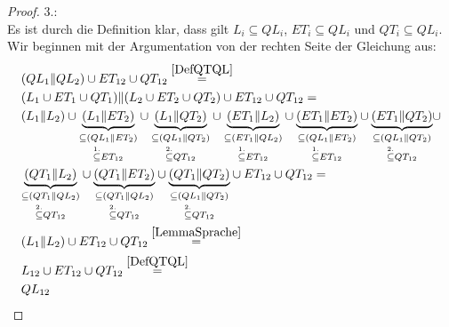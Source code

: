 \begin{proof}
  3.:\\
  Es ist durch die Definition klar, dass gilt $L_i\subseteq QL_i$,
  $ET_i\subseteq QL_i$ und $QT_i\subseteq QL_i$. Wir beginnen mit der
  Argumentation von der rechten Seite der Gleichung aus:
  \begin{align*}
    &(QL_1\| QL_2)\cup ET_{12}\cup QT_{12}\overset{\ref{DefQTQL}}{=}\\
    &(L_1\cup ET_1\cup QT_1)\|(L_2\cup ET_2\cup QT_2)\cup ET_{12}\cup QT_{12}=\\
    &(L_1\|L_2)\cup
    \underset{\overset{1.}{\subseteq} ET_{12}}{\underset{\subseteq
    (QL_1\|ET_2)}{\underbrace{(L_1\|ET_2)}}} \cup
    \underset{\overset{2.}{\subseteq} QT_{12}}{\underset{\subseteq
    (QL_1\|QT_2)}{\underbrace{(L_1\|QT_2)}}} \cup
    \underset{\overset{1.}{\subseteq} ET_{12}}{\underset{\subseteq
    (ET_1\|QL_2)}{\underbrace{(ET_1\|L_2)}}} \cup
    \underset{\overset{1.}{\subseteq} ET_{12}}{\underset{\subseteq
    (QL_1\|ET_2)}{\underbrace{(ET_1\|ET_2)}}} \cup
    \underset{\overset{2.}{\subseteq} QT_{12}}{\underset{\subseteq
    (QL_1\|QT_2)}{\underbrace{(ET_1\|QT_2)}}} \cup\\
    &\underset{\overset{2.}{\subseteq} QT_{12}}{\underset{\subseteq
    (QT_1\|QL_2)}{\underbrace{(QT_1\|L_2)}}} \cup
    \underset{\overset{2.}{\subseteq} QT_{12}}{\underset{\subseteq
    (QT_1\|QL_2)}{\underbrace{(QT_1\|ET_2)}}} \cup
    \underset{\overset{2.}{\subseteq} QT_{12}}{\underset{\subseteq
    (QL_1\|QT_2)}{\underbrace{(QT_1\|QT_2)}}} \cup
    ET_{12} \cup QT_{12}=\\
    &(L_1\|L_2) \cup ET_{12} \cup QT_{12}\overset{\ref{LemmaSprache}}{=}\\
    &L_{12}\cup ET_{12}\cup QT_{12}\overset{\ref{DefQTQL}}{=}\\
    &QL_{12}
  \end{align*}
\end{proof}
